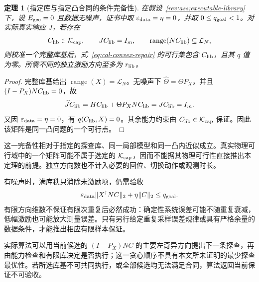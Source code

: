 \documentclass[11pt,a4paper]{article}
\numberwithin{equation}{section}
\newtheorem{theorem}{定理}[section]
\theoremstyle{definition}
\begin{document}
\begin{theorem}[指定库与指定凸合同的条件完备性]
\label{rev:thm:library-completeness}
在假设~\ref{rev:ass:executable-library} 下，设
$E_{\rm geo}=0$ 且数据无噪声，证书中取 $\varepsilon_{\rm data}=\eta=0$，并取 $0\le q_{\rm goal}<1$。对实际真实响应 $J$，若存在
\begin{equation}
 C_{\rm lib}\in\mathcal K_{\rm cap},\qquad
 JC_{\rm lib}=I_m,\qquad
 \operatorname{range}(NC_{\rm lib})
 \subseteq\mathcal L_N,
 \label{rev:eq:library-witness}
\end{equation}
则校准一个完整库基后，式~\eqref{eq:cal-convex-repair} 的可行集包含
$C_{\rm lib}$，且其 $q$ 值为零。所需不同的独立激励方向至多为 $r_{\rm lib}$。
\end{theorem}
\begin{proof}
完整库基给出 $\operatorname{range}(X)=\mathcal L_N$。无噪声下
$\widehat\Theta=\Theta P_X$，并且
$(I-P_X)NC_{\rm lib}=0$，故
\begin{equation}
 \widehat J C_{\rm lib}
 =
 H C_{\rm lib}
 +\Theta P_XNC_{\rm lib}
 =
 JC_{\rm lib}
 =I_m .
 \label{rev:eq:library-exact-repair}
\end{equation}
又因 $\varepsilon_{\rm data}=\eta=0$，有
$q(C_{\rm lib},X)=0$。其余能力约束由
$C_{\rm lib}\in\mathcal K_{\rm cap}$ 保证。因此该矩阵是同一凸问题的一个可行点。
\end{proof}

这一完备性相对于指定的探查库、同一局部模型和同一凸内近似成立。真实物理可行域中的一个矩阵可能不属于选定的 $\mathcal K_{\rm cap}$，因而不能据其物理可行性直接推出本定理的前提。独立方向数也不计入必要的回位、切换动作或观测时长。

有噪声时，满库秩只消除未激励项，仍需验收
\begin{equation}
 \varepsilon_{\rm data}\|X^\dagger NC\|_2+\eta\|C\|_2
 \le q_{\rm goal}.
 \label{rev:eq:noisy-library-residual}
\end{equation}
有限方向维数不保证有限次重复后必然成功：确定性系统误差可能不随重复衰减，低幅激励也可能放大测量误差。只有另行给定重复采样误差规律或具有严格余量的数据条件，才能推出相应有限样本保证。

实际算法可以用当前候选的 $(I-P_X)NC$ 的主要左奇异方向提出下一条探查，再由能力检查和有限库决定是否执行；这一贪心顺序不具有本文所未证明的最少探查最优性。若所选库基不可共同执行，或全部候选均无法满足合同，算法返回当前保证不可验收。
\end{document}
